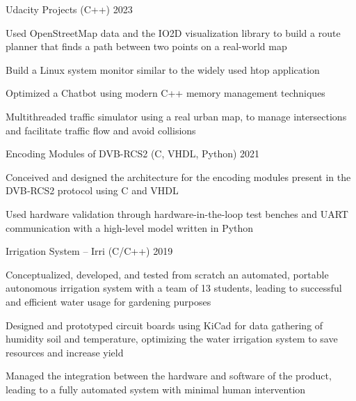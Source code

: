 
\begin{cventries}

    
  \cventry
    {Udacity Projects (C++)} %
    {2023}%
    {}{} 
    {\begin{cvitems}
        \item{Used OpenStreetMap data and the IO2D visualization library to build a route planner that finds a path between two points on a real-world map}
        \item{Build a Linux system monitor similar to the widely used htop application}
        \item{Optimized a Chatbot using modern C++ memory management techniques}
        \item{Multithreaded traffic simulator using a real urban map, to manage intersections and facilitate traffic flow and avoid collisions}
    \end{cvitems}
    }
    
  \cventry
    {Encoding Modules of DVB-RCS2 (C, VHDL, Python)} %
    {2021} %
    {}{}
    {
    \begin{cvitems}
        \item Conceived and designed the architecture for the encoding modules present in the DVB‑RCS2 protocol using C and VHDL
        \item Used hardware validation through hardware-in-the-loop test benches and UART communication with a high-level model written in Python
    \end{cvitems}
    }

  \cventry
    {Irrigation System -- Irri (C/C++)}
    {2019} %
    {}{} %
    {          
    \begin{cvitems}
    \item Conceptualized, developed, and tested from scratch an automated, portable autonomous irrigation system with a team of 13 students, leading to successful and efficient water usage for gardening purposes
            \item Designed and prototyped circuit boards using KiCad for data gathering of humidity soil and temperature, optimizing the water irrigation system to save resources and increase yield
            \item Managed the integration between the hardware and software of the product, leading to a fully automated system with minimal human intervention
    \end{cvitems}
            }


\end{cventries}
